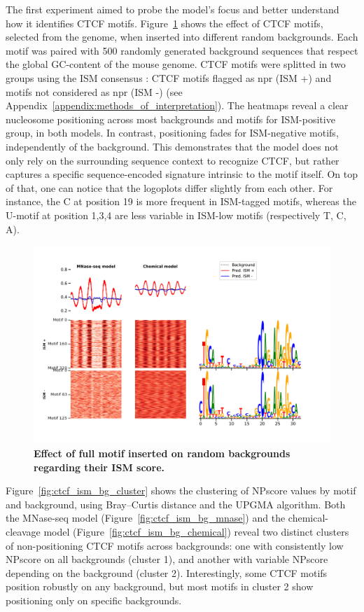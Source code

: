 \documentclass[11pt]{book}
\begin{document}
The first experiment aimed to probe the model’s focus and better understand how it identifies CTCF motifs. Figure~\ref{fig:ctcf_ism_bg} shows the effect of CTCF motifs, selected from the genome, when inserted into different random backgrounds. Each motif was paired with 500 randomly generated background sequences that respect the global GC-content of the mouse genome. CTCF motifs were splitted in two groups using the ISM consensus : CTCF motifs flagged as \gls{npr} (ISM +) and motifs not considered as \gls{npr} (ISM -) (see Appendix~\ref{appendix:methods_of_interpretation}). The heatmaps reveal a clear nucleosome positioning across most backgrounds and motifs for ISM-positive group, in both models. In contrast, positioning fades for ISM-negative motifs, independently of the background. This demonstrates that the model does not only rely on the surrounding sequence context to recognize CTCF, but rather captures a specific sequence-encoded signature intrinsic to the motif itself. On top of that, one can notice that the logoplots differ slightly from each other. For instance, the C at position 19 is more frequent in ISM-tagged motifs, whereas the U-motif at position 1,3,4 are less variable in ISM-low motifs (respectively T, C, A).

\begin{figure}[htbp]
\centering
    \includegraphics[width=\textwidth]{Figures/Results/natural_on500bg_ismPlusMinus.pdf}
    \caption{\textbf{Effect of full motif inserted on random backgrounds regarding their ISM score.}}
    \label{fig:ctcf_ism_bg}
\end{figure}

Figure~\ref{fig:ctcf_ism_bg_cluster} shows the clustering of NPscore values by motif and background, using Bray–Curtis distance and the UPGMA algorithm. Both the MNase-seq model (Figure~\ref{fig:ctcf_ism_bg_mnase}) and the chemical-cleavage model (Figure~\ref{fig:ctcf_ism_bg_chemical}) reveal two distinct clusters of non-positioning CTCF motifs across backgrounds: one with consistently low NPscore on all backgrounds (cluster 1), and another with variable NPscore depending on the background (cluster 2). Interestingly, some CTCF motifs position robustly on any background, but most motifs in cluster 2 show positioning only on specific backgrounds.
\end{document}
